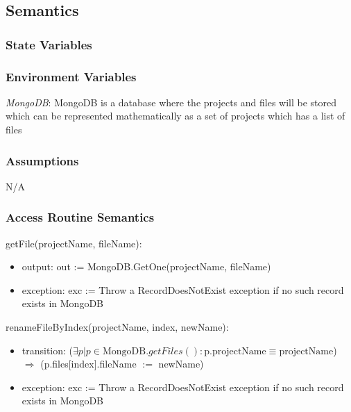 \documentclass[12pt, titlepage]{article}
\begin{document}
	\subsection{Semantics}
	
	\subsubsection{State Variables}
	
	\subsubsection{Environment Variables}
	
	\textit{MongoDB}: MongoDB is a database where the projects and files will be stored which can be represented mathematically as a set of projects which has a list of files
	
	\subsubsection{Assumptions}
	
	N/A
	
	\subsubsection{Access Routine Semantics}
	
	\noindent getFile(projectName, fileName):
	\begin{itemize}
		
		\item output: out := MongoDB.GetOne(projectName, fileName)
		
		\item exception: exc := Throw a RecordDoesNotExist exception if no such record exists in MongoDB
		
	\end{itemize}
	
	\noindent renameFileByIndex(projectName, index, newName):
	\begin{itemize}
		
		\item transition: ($\exists p| p \in \text{MongoDB}.getFiles() : \text{p.projectName} \equiv \text{projectName}$) $\Rightarrow$ (p.files[index].fileName $:=$ newName)
		
		\item exception: exc := Throw a RecordDoesNotExist exception if no such record exists in MongoDB
		
	\end{itemize}
	
\end{document}

